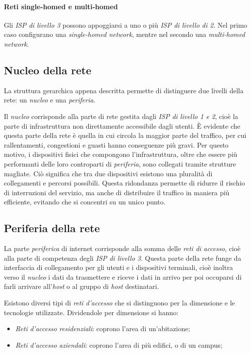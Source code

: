 \paragraph{Reti single-homed e multi-homed}
Gli \emph{ISP di livello 3} possono appoggiarsi a uno o più \emph{ISP di livello
di 2}. Nel primo caso configurano una \emph{single-homed network}, mentre nel
secondo una \emph{multi-homed network}.

\subsection{Nucleo della rete}
La struttura gerarchica appena descritta permette di distinguere due livelli
della rete: un \emph{nucleo} e una \emph{periferia}.

Il \emph{nucleo} corrisponde alla parte di rete gestita dagli \emph{ISP di livello
1 e 2}, cioè la parte di infrastruttura non direttamente accessibile dagli utenti.
È evidente che questa parte della rete è quella in cui circola la maggior parte
del traffico, per cui rallentamenti, congestioni e guasti hanno conseguenze più
gravi. Per questo motivo, i dispositivi fisici che compongono
l'infrastruttura, oltre che essere più performanti delle loro controparti di
\emph{periferia}, sono collegati tramite strutture magliate. Ciò significa che
tra due dispositivi esistono una pluralità di collegamenti e percorsi possibili.
Questa ridondanza permette di ridurre il rischio di interruzioni del servizio, ma
anche di distribuire il traffico in maniera più efficiente, evitando che si
concentri su un unico punto.

\subsection{Periferia della rete}
La parte \emph{periferica} di internet corrisponde alla somma delle
\emph{reti di accesso}, cioè alla parte di competenza degli \emph{ISP di livello
3}. Questa parte della rete funge da interfaccia di collegamento per gli utenti
e i dispositivi terminali, cioè inoltra verso il \emph{nucleo} i dati da
trasmettere e riceve i dati in arrivo per poi occuparsi di farli arrivare
all'\emph{host} o al gruppo di \emph{host} destinatari.

Esistono diversi tipi di \emph{reti d'accesso} che si distinguono per la
dimensione e le tecnologie utilizzate.
Dividendole per dimensione si hanno:
\begin{itemize}
    \item \emph{Reti d'accesso residenziali}: coprono l'area di un'abitazione;
    \item \emph{Reti d'accesso aziendali}: coprono l'area di più edifici, o di
    un campus;
\end{itemize}

